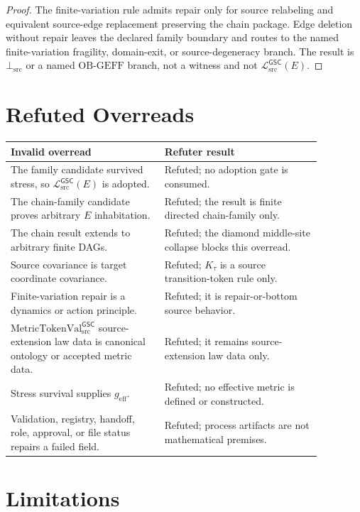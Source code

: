 \documentclass[11pt]{article}
\newcommand{\MetricTokenVal}{\mathrm{MetricTokenVal}_{\mathrm{src}}^{\mathsf{GSC}}}
\newcommand{\MetricData}{\mathcal{L}_{\mathrm{src}}^{\mathsf{GSC}}}
\newcommand{\BottomSrc}{\bot_{\mathrm{src}}}
\newcommand{\OBGEFF}{\mathrm{OB\mbox{-}GEFF}}
\newcommand{\geff}{g_{\mathrm{eff}}}
\begin{document}
\begin{proof}
The finite-variation rule admits repair only for source relabeling and
equivalent source-edge replacement preserving the chain package. Edge deletion
without repair leaves the declared family boundary and routes to the named
finite-variation fragility, domain-exit, or source-degeneracy branch. The
result is \(\BottomSrc\) or a named \(\OBGEFF\) branch, not a witness and not
\(\MetricData(E)\).
\end{proof}

\section{Refuted Overreads}

\begin{center}
\begin{tabular}{p{0.43\linewidth}p{0.44\linewidth}}
\toprule
Invalid overread & Refuter result \\
\midrule
The family candidate survived stress, so \(\MetricData(E)\) is adopted. &
Refuted; no adoption gate is consumed. \\
The chain-family candidate proves arbitrary \(E\) inhabitation. &
Refuted; the result is finite directed chain-family only. \\
The chain result extends to arbitrary finite DAGs. &
Refuted; the diamond middle-site collapse blocks this overread. \\
Source covariance is target coordinate covariance. &
Refuted; \(K_{\tau}\) is a source transition-token rule only. \\
Finite-variation repair is a dynamics or action principle. &
Refuted; it is repair-or-bottom source behavior. \\
\(\MetricTokenVal\) source-extension law data is canonical ontology or
accepted metric data. &
Refuted; it remains source-extension law data only. \\
Stress survival supplies \(\geff\). &
Refuted; no effective metric is defined or constructed. \\
Validation, registry, handoff, role, approval, or file status repairs a
failed field. &
Refuted; process artifacts are not mathematical premises. \\
\bottomrule
\end{tabular}
\end{center}

\section{Limitations}
\end{document}
